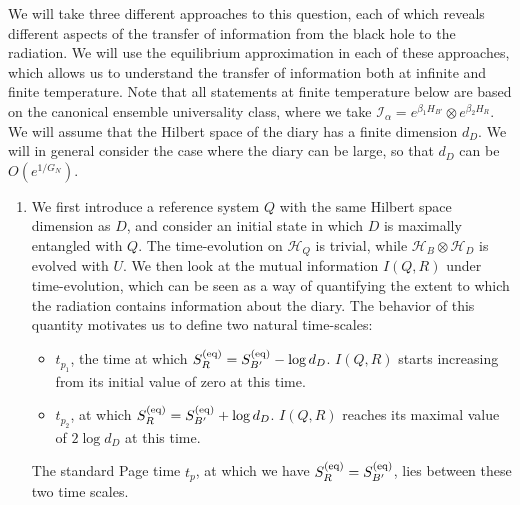 \documentclass[a4paper,11pt]{article}
\newcommand\al{{\alpha}}
\newcommand\sI{{\ensuremath{{\mathcal I}}}}
\newcommand\sH{{\ensuremath{{\mathcal H}}}}
\begin{document}
\begin{enumerate}
We will take three different approaches to this question, each of which reveals different aspects of the transfer of information from the black hole to the radiation. We will use the equilibrium approximation in each of these approaches, which allows us to understand the transfer of information both at infinite and finite temperature. Note that all statements at finite temperature below are based on the canonical ensemble universality class, where we take $\sI_{\al} = e^{\beta_1 H_{B'}} \otimes e^{\beta_2 H_{R}}$. We will assume that the Hilbert space of the diary has a finite dimension $d_D$. We will in general consider the case where the diary can be large, so that $d_D$ can be $O(e^{1/G_N})$.
\begin{enumerate} 
\item We first introduce a reference system $Q$ with the same Hilbert space dimension as $D$, 
and consider an initial state in which $D$ is maximally entangled with $Q$. The time-evolution on $\sH_Q$ is trivial, while $\sH_B \otimes \sH_D$ is evolved with $U$. We then look at the mutual information $I(Q, R)$ under time-evolution, which can be seen as a way of quantifying the extent to which the radiation contains information about the diary. The behavior of this quantity motivates us to define two natural time-scales: 
\begin{itemize} 
\item $t_{p_1}$, the time at which $S^{\rm (eq)}_R = S^{\rm (eq)}_{B'} - \log d_D$. $I(Q, R)$ starts increasing from its initial value of zero at this time. 
\item $t_{p_2}$, at which $S^{\rm (eq)}_R = S^{\rm (eq)}_{B'} + \log d_D$. $I(Q, R)$ reaches its maximal value of $2\log d_D$ at this time. 
\end{itemize} 
The standard Page time $t_p$, at which we have $S_R^{\rm (eq)} = S_{B'}^{\rm (eq)}$, lies between these two time scales. 


\end{enumerate}
\end{enumerate}
\end{document}
